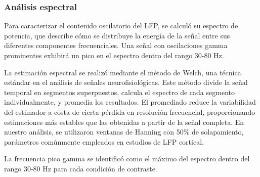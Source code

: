   \subsubsection{Análisis espectral}
 Para caracterizar el contenido oscilatorio del \acrshort{LFP}, se calculó su espectro de potencia, 
que describe cómo se distribuye la energía de la señal entre sus diferentes componentes 
frecuenciales. Una señal con oscilaciones gamma prominentes exhibirá un pico en el espectro 
dentro del rango 30-80 Hz.

La estimación espectral se realizó mediante el método de Welch, una técnica estándar en el 
análisis de señales neurofisiológicas. Este método divide la señal temporal en segmentos 
superpuestos, calcula el espectro de cada segmento individualmente, y promedia los resultados. 
El promediado reduce la variabilidad del estimador a costa de cierta pérdida en resolución 
frecuencial, proporcionando estimaciones más estables que las obtenidas a partir de la señal 
completa. En nuestro análisis, se utilizaron ventanas de Hanning con 50\% de solapamiento, 
parámetros comúnmente empleados en estudios de \acrshort{LFP} cortical.

La frecuencia pico gamma se identificó como el máximo del espectro dentro del rango 30-80 Hz 
para cada condición de contraste.

